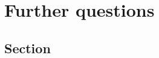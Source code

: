 \documentclass[../../main]{subfiles}
\begin{document}
\chapter{Further questions}
\thispagestyle{fancy}

\section{Section}
\lipsum[1]
\end{document}
